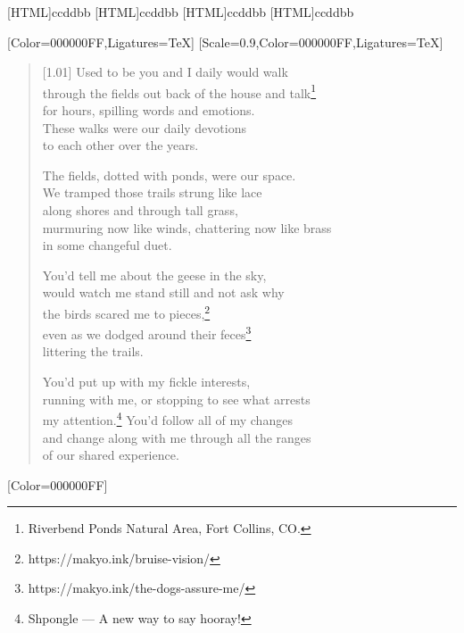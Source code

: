 [HTML]{ccddbb}
[HTML]{ccddbb}
[HTML]{ccddbb}
[HTML]{ccddbb}
\begin{paracol}{2}
  \begin{leftcolumn}
[Color=000000FF,Ligatures=TeX]
\renewfontfamily{}[Scale=0.9,Color=000000FF,Ligatures=TeX]

\begin{verse}[1.01\textwidth]
Used to be you and I daily would walk\\
through the fields out back of the house and talk\footnote{Riverbend Ponds Natural Area, Fort Collins, CO.}\\
for hours, spilling words and emotions.\\
These walks were our daily devotions\\
to each other over the years.

The fields, dotted with ponds, were our space.\\
We tramped those trails strung like lace\\
along shores and through tall grass,\\
murmuring now like winds, chattering now like brass\\
in some changeful duet.

You'd tell me about the geese in the sky,\\
would watch me stand still and not ask why\\
the birds scared me to pieces,\footnote{https://makyo.ink/bruise-vision/}\\
even as we dodged around their feces\footnote{https://makyo.ink/the-dogs-assure-me/}\\
littering the trails.

You'd put up with my fickle interests,\\
running with me, or stopping to see what arrests\\
my attention.\footnote{Shpongle --- A new way to say hooray!} You'd follow all of my changes\\
and change along with me through all the ranges\\
of our shared experience.
\end{verse}
\newpage
\end{leftcolumn}
\end{paracol}

\renewfontfamily{}[Color=000000FF]

